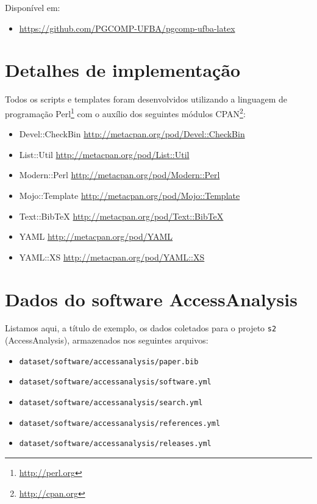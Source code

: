 Disponível em:

\begin{itemize}
  \item \url{https://github.com/PGCOMP-UFBA/pgcomp-ufba-latex}
\end{itemize}

\section{Detalhes de implementação}

Todos os scripts e templates foram desenvolvidos utilizando a linguagem de
programação Perl\footnote{\url{http://perl.org}} com o auxílio dos seguintes
módulos CPAN\footnote{\url{http://cpan.org}}:

\begin{itemize}
  \item Devel::CheckBin \url{http://metacpan.org/pod/Devel::CheckBin}
  \item List::Util \url{http://metacpan.org/pod/List::Util}
  \item Modern::Perl \url{http://metacpan.org/pod/Modern::Perl}
  \item Mojo::Template \url{http://metacpan.org/pod/Mojo::Template}
  \item Text::BibTeX \url{http://metacpan.org/pod/Text::BibTeX}
  \item YAML \url{http://metacpan.org/pod/YAML}
  \item YAML::XS \url{http://metacpan.org/pod/YAML::XS}
\end{itemize}

\section{Dados do software AccessAnalysis}

Listamos aqui, a título de exemplo, os dados coletados para o projeto
\texttt{s2} (AccessAnalysis), armazenados nos seguintes arquivos:

\begin{itemize}
  \item \texttt{dataset/software/accessanalysis/paper.bib}
  \item \texttt{dataset/software/accessanalysis/software.yml}
  \item \texttt{dataset/software/accessanalysis/search.yml}
  \item \texttt{dataset/software/accessanalysis/references.yml}
  \item \texttt{dataset/software/accessanalysis/releases.yml}
\end{itemize}

